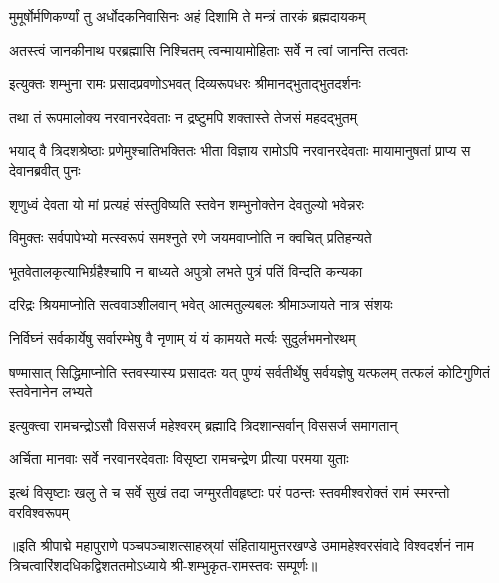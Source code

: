 \twolineshloka
{मुमूर्षोर्मणिकर्ण्यां तु अर्धोदकनिवासिनः}
{अहं दिशामि ते मन्त्रं तारकं ब्रह्मदायकम्} %

\twolineshloka
{अतस्त्वं जानकीनाथ परब्रह्मासि निश्चितम्}
{त्वन्मायामोहिताः सर्वे न त्वां जानन्ति तत्वतः} %


\twolineshloka
{इत्युक्तः शम्भुना रामः प्रसादप्रवणोऽभवत्}
{दिव्यरूपधरः श्रीमानद्भुताद्भुतदर्शनः} %

\twolineshloka
{तथा तं रूपमालोक्य नरवानरदेवताः}
{न द्रष्टुमपि शक्तास्ते तेजसं महदद्भुतम्} %

\threelineshloka
{भयाद् वै त्रिदशश्रेष्ठाः प्रणेमुश्चातिभक्तितः}
{भीता विज्ञाय रामोऽपि नरवानरदेवताः}
{मायामानुषतां प्राप्य स देवानब्रवीत् पुनः} %


\twolineshloka
{शृणुध्वं देवता यो मां प्रत्यहं संस्तुविष्यति}
{स्तवेन शम्भुनोक्तेन देवतुल्यो भवेन्नरः} %

\twolineshloka
{विमुक्तः सर्वपापेभ्यो मत्स्वरूपं समश्नुते}
{रणे जयमवाप्नोति न क्वचित् प्रतिहन्यते} %

\twolineshloka
{भूतवेतालकृत्याभिर्ग्रहैश्चापि न बाध्यते}
{अपुत्रो लभते पुत्रं पतिं विन्दति कन्यका} %

\twolineshloka
{दरिद्रः श्रियमाप्नोति सत्ववाञ्शीलवान् भवेत्}
{आत्मतुल्यबलः श्रीमाञ्जायते नात्र संशयः} %

\twolineshloka
{निर्विघ्नं सर्वकार्येषु सर्वारम्भेषु वै नृणाम्}
{यं यं कामयते मर्त्यः सुदुर्लभमनोरथम्} %

\threelineshloka
{षण्मासात् सिद्धिमाप्नोति स्तवस्यास्य प्रसादतः}
{यत् पुण्यं सर्वतीर्थेषु सर्वयज्ञेषु यत्फलम्}
{तत्फलं कोटिगुणितं स्तवेनानेन लभ्यते} %


\twolineshloka
{इत्युक्त्वा रामचन्द्रोऽसौ विससर्ज महेश्वरम्}
{ब्रह्मादि त्रिदशान्सर्वान् विससर्ज समागतान्} %

\twolineshloka
{अर्चिता मानवाः सर्वे नरवानरदेवताः}
{विसृष्टा रामचन्द्रेण प्रीत्या परमया युताः} %

\fourlineindentedshloka
{इत्थं विसृष्टाः खलु ते च सर्वे}
{सुखं तदा जग्मुरतीवहृष्टाः}
{परं पठन्तः स्तवमीश्वरोक्तं}
{रामं स्मरन्तो वरविश्वरूपम्} %

॥इति श्रीपाद्मे महापुराणे पञ्चपञ्चाशत्साहस्र्यां संहितायामुत्तरखण्डे उमामहेश्वरसंवादे विश्वदर्शनं नाम त्रिचत्वारिंशदधिकद्विशततमोऽध्याये श्री-शम्भुकृत-रामस्तवः सम्पूर्णः॥

